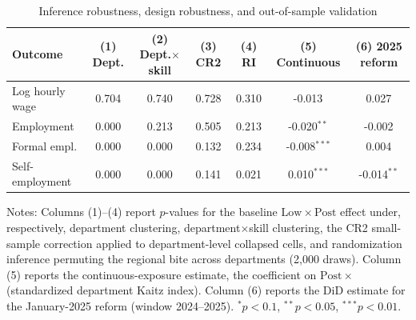 \begin{table}[H]\centering
\caption{Inference robustness, design robustness, and out-of-sample validation}\label{tab:inference}
\begin{threeparttable}
\footnotesize
\begin{tabular}{lcccccc}
\toprule
Outcome & (1) Dept. & (2) Dept.$\times$skill & (3) CR2 & (4) RI & (5) Continuous & (6) 2025 reform \\
\midrule
Log hourly wage & 0.704 & 0.740 & 0.728 & 0.310 & -0.013$^{}$ & 0.027$^{}$ \\
Employment & 0.000 & 0.213 & 0.505 & 0.213 & -0.020$^{**}$ & -0.002$^{}$ \\
Formal empl. & 0.000 & 0.000 & 0.132 & 0.234 & -0.008$^{***}$ & 0.004$^{}$ \\
Self-employment & 0.000 & 0.000 & 0.141 & 0.021 & 0.010$^{***}$ & -0.014$^{**}$ \\
\bottomrule
\end{tabular}
\begin{tablenotes}\footnotesize
\item Notes: Columns (1)--(4) report $p$-values for the baseline $\mathrm{Low}\times\mathrm{Post}$ effect under, respectively, department clustering, department$\times$skill clustering, the CR2 small-sample correction \citep{pustejovsky_tipton_2018} applied to department-level collapsed cells, and randomization inference permuting the regional bite across departments (2{,}000 draws). Column (5) reports the continuous-exposure estimate, the coefficient on $\mathrm{Post}\times$(standardized department Kaitz index). Column (6) reports the DiD estimate for the January-2025 reform (window 2024--2025). $^{*}p<0.1$, $^{**}p<0.05$, $^{***}p<0.01$.
\end{tablenotes}
\end{threeparttable}\end{table}
